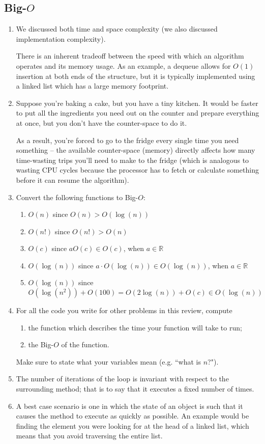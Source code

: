 \documentclass[10pt]{article}
\begin{document}
\subsection{Big-$O$}
\begin{enumerate}[leftmargin=0em]
    \item We discussed both time and space complexity (we also discussed implementation complexity).
    
    There is an inherent tradeoff between the speed with which an algorithm operates and its memory usage. As an example, a dequeue allows for $O(1)$ insertion at both ends of the structure, but it is typically implemented using a linked list which has a large memory footprint.
    \item Suppose you're baking a cake, but you have a tiny kitchen. It would be faster to put all the ingredients you need out on the counter and prepare everything at once, but you don't have the counter-space to do it.
    
    As a result, you're forced to go to the fridge every single time you need something -- the available counter-space (memory) directly affects how many time-wasting trips you'll need to make to the fridge (which is analogous to wasting CPU cycles because the processor has to fetch or calculate something before it can resume the algorithm).
    \item Convert the following functions to Big-$O$:
    \begin{enumerate}
        \item $O(n)$ since $O(n) > O(\log(n))$
        \item $O(n!)$ since $O(n!) > O(n)$
        \item $O(c)$ since $aO(c) \in O(c)$, when $a\in\mathbb{R}$
        \item $O(\log(n))$ since $a\cdot O(\log(n)) \in O(\log(n))$, when $a\in\mathbb{R}$
        \item $O(\log(n))$ since $O(\log(n^2)) + O(100) = O(2\log(n)) + O(c) \in O(\log(n))$
    \end{enumerate}
    \item For all the code you write for other problems in this review, compute
    \begin{enumerate}
        \item the function which describes the time your function will take to run;
        \item the Big-$O$ of the function.
    \end{enumerate}
    Make sure to state what your variables mean (e.g. ``what is $n$?").
    \item The number of iterations of the loop is invariant with respect to the surrounding method; that is to say that it executes a fixed number of times.
    \item A best case scenario is one in which the state of an object is such that it causes the method to execute as quickly as possible. An example would be finding the element you were looking for at the head of a linked list, which means that you avoid traversing the entire list.


\end{enumerate}
\end{document}
